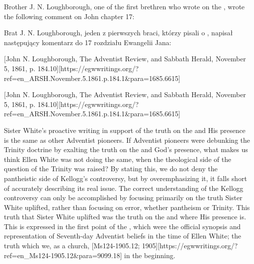 Brother J. N. Loughborough, one of the first brethren who wrote on the , wrote the following comment on John chapter 17:


Brat J. N. Loughborough, jeden z pierwszych braci, którzy pisali o , napisał następujący komentarz do 17 rozdziału Ewangelii Jana:


[John N. Loughborough, The Adventist Review, and Sabbath Herald, November 5, 1861, p. 184.10][https://egwwritings.org/?ref=en\_ARSH.November.5.1861.p.184.1&para=1685.6615]


[John N. Loughborough, The Adventist Review, and Sabbath Herald, November 5, 1861, p. 184.10][https://egwwritings.org/?ref=en\_ARSH.November.5.1861.p.184.1&para=1685.6615]


Sister White’s proactive writing in support of the truth on the  and His presence is the same as other Adventist pioneers. If Adventist pioneers were debunking the Trinity doctrine by exalting the truth on the  and God’s presence, what makes us think Ellen White was not doing the same, when the theological side of the question of the Trinity was raised? By stating this, we do not deny the pantheistic side of Kellogg’s controversy, but by overemphasizing it, it falls short of accurately describing its real issue. The correct understanding of the Kellogg controversy can only be accomplished by focusing primarily on the truth Sister White uplifted, rather than focusing on error, whether pantheism or Trinity. This truth that Sister White uplifted was the truth on the  and where His presence is. This is expressed in the first point of the , which were the official synopsis and representation of Seventh-day Adventist beliefs in the time of Ellen White; the truth which we, as a church, [Ms124-1905.12; 1905][https://egwwritings.org/?ref=en\_Ms124-1905.12&para=9099.18] in the beginning.


